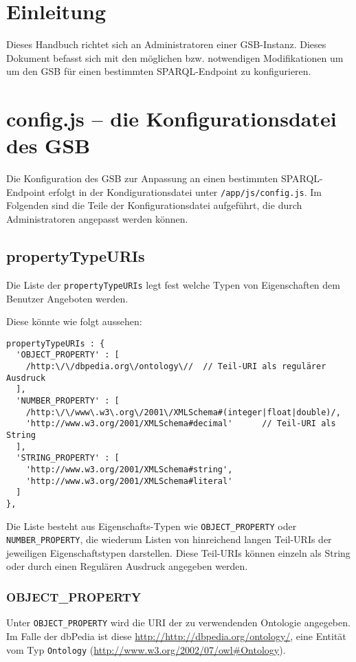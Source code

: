 \section{Einleitung}

Dieses Handbuch richtet sich an Administratoren einer GSB-Instanz.
Dieses Dokument befasst sich mit den möglichen bzw. notwendigen Modifikationen um um den GSB für einen bestimmten SPARQL-Endpoint zu konfigurieren.

\section{config.js -- die Konfigurationsdatei des GSB}

Die Konfiguration des GSB zur Anpassung an einen bestimmten
SPARQL-Endpoint erfolgt in der Kondigurationsdatei unter
\verb+/app/js/config.js+.
Im Folgenden sind die Teile der Konfigurationsdatei aufgeführt, die
durch Administratoren angepasst werden können.

\subsection{propertyTypeURIs}

Die Liste der \verb+propertyTypeURIs+ legt fest welche Typen von
Eigenschaften dem Benutzer Angeboten werden.

Diese könnte wie folgt aussehen:

\begin{Verbatim}
propertyTypeURIs : {
  'OBJECT_PROPERTY' : [
    /http:\/\/dbpedia.org\/ontology\//  // Teil-URI als regulärer Ausdruck
  ],
  'NUMBER_PROPERTY' : [
    /http:\/\/www\.w3\.org\/2001\/XMLSchema#(integer|float|double)/,
    'http://www.w3.org/2001/XMLSchema#decimal'      // Teil-URI als String
  ],
  'STRING_PROPERTY' : [
    'http://www.w3.org/2001/XMLSchema#string',
    'http://www.w3.org/2001/XMLSchema#literal'
  ]
},
\end{Verbatim}
Die Liste besteht aus Eigenschafts-Typen wie \verb+OBJECT_PROPERTY+
oder \verb+NUMBER_PROPERTY+, die wiederum Listen von hinreichend
langen Teil-URIs der jeweiligen Eigenschaftstypen darstellen.
Diese Teil-URIs können einzeln als String oder durch einen Regulären
Ausdruck angegeben werden.

\subsubsection{OBJECT\_PROPERTY}

Unter \verb+OBJECT_PROPERTY+ wird die URI der zu verwendenden
Ontologie angegeben. Im Falle der dbPedia ist diese
\url{http://http://dbpedia.org/ontology/}, eine Entität vom Typ
\verb+Ontology+ (\url{http://www.w3.org/2002/07/owl#Ontology}).

